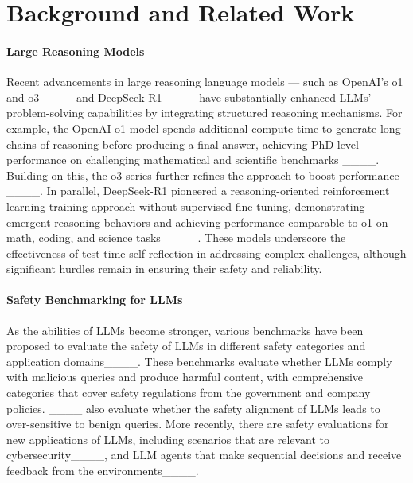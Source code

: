 \section{Background and Related Work}
\paragraph{Large Reasoning Models} 
Recent advancements in large reasoning language models — such as OpenAI’s o1 and o3____ and DeepSeek-R1____ have substantially enhanced LLMs’ problem-solving capabilities by integrating structured reasoning mechanisms. For example, the OpenAI o1 model spends additional compute time to generate long chains of reasoning before producing a final answer, achieving PhD-level performance on challenging mathematical and scientific benchmarks ____. Building on this, the o3 series further refines the approach to boost performance ____. In parallel, DeepSeek-R1 pioneered a reasoning-oriented reinforcement learning training approach without supervised fine-tuning, demonstrating emergent reasoning behaviors and achieving performance comparable to o1 on math, coding, and science tasks ____. These models underscore the effectiveness of test-time self-reflection in addressing complex challenges, although significant hurdles remain in ensuring their safety and reliability.


\paragraph{Safety Benchmarking for LLMs} 
As the abilities of LLMs become stronger, various benchmarks have been proposed to evaluate the safety of LLMs in different safety categories and application domains____. 
These benchmarks evaluate whether LLMs comply with malicious queries and produce harmful content, with comprehensive categories that cover safety regulations from the government and company policies. ____ also evaluate whether the safety alignment of LLMs leads to over-sensitive to benign queries. 
More recently, there are safety evaluations for new applications of LLMs, including scenarios that are relevant to cybersecurity____, and LLM agents that make sequential decisions and receive feedback from the environments____.

